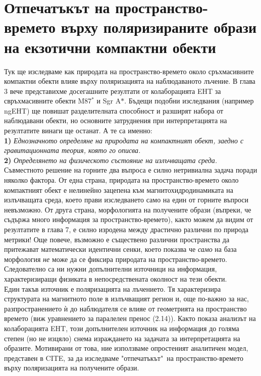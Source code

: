 \section{Отпечатъкът на пространство-времето върху поляризираните образи на екзотични компактни обекти}
Тук ще изследваме как природата на пространство-времето около сръхмасивните компактни обекти влияе върху поляризацията на наблюдаваното лъчение. В глава 3 вече представихме досегашните резултати от колаборацията EHT за свръхмасивните обекти M87$^*$ и Sgr A$*$. Бъдещи подобни изследвания (например ngEHT) ще повишат разделителната способност и разширят набора от наблюдавани обекти, но основните затруднения при интерпретацията на резултатите винаги ще останат. А те са именно:\\

\textbf{1)} \emph{Еднозначното определяне на природата на компактният обект, заедно с гравитационната теория, която го описва.}\\

\textbf{2)} \emph{Определянето на физическото състояние на излъчващата среда.}\\

Съвместното решение на горните два въпроса е силно нетривиална задача поради няколко фактора. От една страна, природата на пространство-времето около компактният обект е нелинейно зацепена към магнитохидродинамиката на излъчващата среда, което прави изследването само на един от горните въпроси невъзможно. От друга страна, морфологията на получените образи (въпреки, че съдържа много информация за пространство-времето), както можем да видим от резултатите в глава 7, е силно изродена между драстично различни по природа метрики! Още повече, възможно е съществено различни пространства да притежават математически идентични сенки, което показва че \emph{само} на база морфология \emph{не} може да се фиксира природата на пространство-времето. Следователно са ни нужни допълнителни източници на информация, характеризиращи физиката в непосредствената околност на тези обекти. \\

Един такъв източник е поляризацията на лъчението. Тя характеризира структурата на магнитното поле в излъчващият регион и, още по-важно за нас, разпространението ѝ до наблюдателя се влияе от геометрията на пространство времето (виж уравнението за паралелен пренос (2.14)). Както показа анализът на колаборацията EHT, този допълнителен източник на информация до голяма степен (но не изцяло) снема израждането на задачата за интерпретацията на образите. Мотивирани от това, ние използваме опростеният аналитичен модел, представен в CITE, за да изследваме "отпечатъкът"$\,$ на пространство-времето върху поляризацията на получените образи.\\

